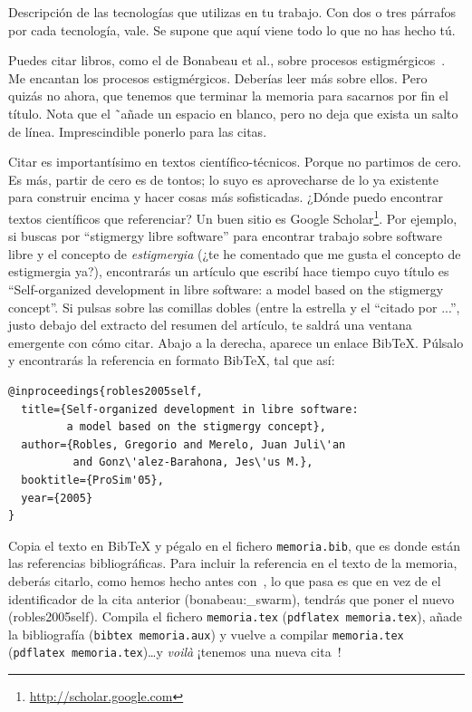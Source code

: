 \documentclass[a4paper, 12pt]{book}
\begin{document}
Descripción de las tecnologías que utilizas en tu trabajo. 
Con dos o tres párrafos por cada tecnología, vale. 
Se supone que aquí viene todo lo que no has hecho tú.

Puedes citar libros, como el de Bonabeau et al., sobre procesos estigmérgicos~\cite{bonabeau:_swarm}. 
Me encantan los procesos estigmérgicos.
Deberías leer más sobre ellos.
Pero quizás no ahora, que tenemos que terminar la memoria para sacarnos por fin el título.
Nota que el \~ \ añade un espacio en blanco, pero no deja que exista un salto de línea. 
Imprescindible ponerlo para las citas.

Citar es importantísimo en textos científico-técnicos. 
Porque no partimos de cero.
Es más, partir de cero es de tontos; lo suyo es aprovecharse de lo ya existente para construir encima y hacer cosas más sofisticadas.
¿Dónde puedo encontrar textos científicos que referenciar?
Un buen sitio es Google Scholar\footnote{\url{http://scholar.google.com}}.
Por ejemplo, si buscas por ``stigmergy libre software'' para encontrar trabajo sobre software libre y el concepto de \emph{estigmergia} (¿te he comentado que me gusta el concepto de estigmergia ya?), encontrarás un artículo que escribí hace tiempo cuyo título es ``Self-organized development in libre software: a model based on the stigmergy concept''.
Si pulsas sobre las comillas dobles (entre la estrella y el ``citado por ...'', justo debajo del extracto del resumen del artículo, te saldrá una ventana emergente con cómo citar.
Abajo a la derecha, aparece un enlace BibTeX.
Púlsalo y encontrarás la referencia en formato BibTeX, tal que así:

{\footnotesize
\begin{verbatim}
@inproceedings{robles2005self,
  title={Self-organized development in libre software:
         a model based on the stigmergy concept},
  author={Robles, Gregorio and Merelo, Juan Juli\'an 
          and Gonz\'alez-Barahona, Jes\'us M.},
  booktitle={ProSim'05},
  year={2005}
}
\end{verbatim}
}

Copia el texto en BibTeX y pégalo en el fichero \texttt{memoria.bib}, que es donde están las referencias bibliográficas.
Para incluir la referencia en el texto de la memoria, deberás citarlo, como hemos hecho antes con~\cite{bonabeau:_swarm}, lo que pasa es que en vez de el identificador de la cita anterior (bonabeau:\_swarm), tendrás que poner el nuevo (robles2005self).
Compila el fichero \texttt{memoria.tex} (\texttt{pdflatex memoria.tex}), añade la bibliografía (\texttt{bibtex memoria.aux}) y vuelve a compilar \texttt{memoria.tex} (\texttt{pdflatex memoria.tex})\ldots y \emph{voilà} ¡tenemos una nueva cita~\cite{robles2005self}!
\end{document}
